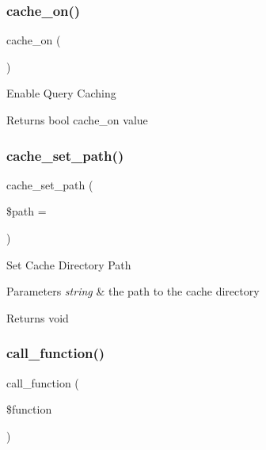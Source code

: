 \subsubsection{\texorpdfstring{cache\+\_\+on()}{cache\_on()}}
{\footnotesize\ttfamily cache\+\_\+on (\begin{DoxyParamCaption}{ }\end{DoxyParamCaption})}

Enable Query Caching

\begin{DoxyReturn}{Returns}
bool cache\+\_\+on value 
\end{DoxyReturn}
\mbox{\label{class_c_i___d_b__driver_aec8df4c9b46f8ba06831911d4c3121df}} 
\subsubsection{\texorpdfstring{cache\+\_\+set\+\_\+path()}{cache\_set\_path()}}
{\footnotesize\ttfamily cache\+\_\+set\+\_\+path (\begin{DoxyParamCaption}\item[{}]{\$path = {\ttfamily \textquotesingle{}\textquotesingle{}} }\end{DoxyParamCaption})}

Set Cache Directory Path


\begin{DoxyParams}{Parameters}
{\em string} & the path to the cache directory \\
\hline
\end{DoxyParams}
\begin{DoxyReturn}{Returns}
void 
\end{DoxyReturn}
\mbox{\label{class_c_i___d_b__driver_af7892f758c89d0e243def92140dbe099}} 
\subsubsection{\texorpdfstring{call\+\_\+function()}{call\_function()}}
{\footnotesize\ttfamily call\+\_\+function (\begin{DoxyParamCaption}\item[{}]{\$function }\end{DoxyParamCaption})}

